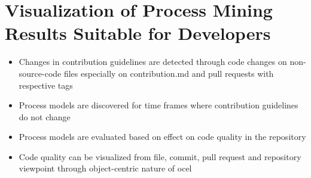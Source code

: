 \section{Visualization of Process Mining Results Suitable for Developers}
\begin{itemize}
	\item Changes in contribution guidelines are detected through code changes on non-source-code files especially on contribution.md and pull requests with respective tags
	\item Process models are discovered for time frames where contribution guidelines do not change
	\item Process models are evaluated based on effect on code quality in the repository
	\item Code quality can be visualized from file, commit, pull request and repository viewpoint through object-centric nature of \ac{ocel}
\end{itemize}